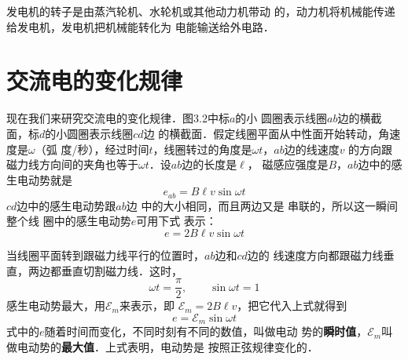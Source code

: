 发电机的转子是由蒸汽轮机、水轮机或其他动力机带动
的，动力机将机械能传递给发电机，发电机把机械能转化为
电能输送给外电路．

\section{交流电的变化规律}

\begin{figure}[htp]\centering
    \caption{}
    \end{figure}

现在我们来研究交流电的变化规律．图3.2中标$a$的小
圆圈表示线圈$ab$边的横截面，标$d$的小圆圈表示线圈$cd$边
的横截面．假定线圈平面从中性面开始转动，角速度是$\omega$（弧
度/秒），经过时间$t$，线圈转过的角度是$\omega t$，$ab$边的线速度$v$
的方向跟磁力线方向间的夹角也等于$\omega t$．设$ab$边的长度是$\ell$，
磁感应强度是$B$，$ab$边中的感
生电动势就是
\[e_{ab}=B\ell v\sin \omega t\]
$cd$边中的感生电动势跟$ab$边
中的大小相同，而且两边又是
串联的，所以这一瞬间整个线
圈中的感生电动势$e$可用下式
表示：
\[e=2B\ell v\sin \omega t\]

当线圈平面转到跟磁力线平行的位置时，$ab$边和$cd$边的
线速度方向都跟磁力线垂直，两边都垂直切割磁力线．这时，
\[\omega t=\frac{\pi}{2},\qquad \sin \omega t=1 \]
感生电动势最大，用$\mathcal{E}_m$来表示，即
$\mathcal{E}_m=2B\ell v$，把它代入上式就得到
\begin{equation}
    e=\mathcal{E}_m \sin\omega t
\end{equation}
式中的$e$随着时间而变化，不同时刻有不同的数值，叫做电动
势的\textbf{瞬时值}，$\mathcal{E}_m$叫做电动势的\textbf{最大值}．上式表明，电动势是
按照正弦规律变化的．

